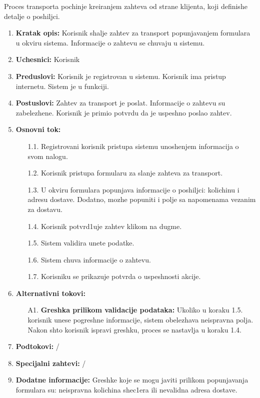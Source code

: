 
Proces transporta pochinje kreiranjem zahteva od strane klijenta, koji definishe detalje o poshiljci. 


\begin{enumerate}
    \item \textbf{Kratak opis:} Korisnik shalje zahtev za transport popunjavanjem formulara u okviru sistema. Informacije o zahtevu se chuvaju u sistemu.
    
    \item \textbf{Uchesnici:} Korisnik
    \item \textbf{Preduslovi:} Korisnik je registrovan u sistemu. Korisnik ima pristup internetu. Sistem je u funkciji.
    \item \textbf{Postuslovi:} Zahtev za transport je poslat. Informacije o zahtevu su zabelezhene. Korisnik je primio potvrdu da je uspeshno poslao zahtev.
    \item \textbf{Osnovni tok:}
        \begin{enumerate}
            \item[1.1.] Registrovani korisnik pristupa sistemu unoshenjem informacija o svom nalogu.
            
            \item[1.2.] Korisnik pristupa formularu za slanje zahteva za transport.
            \item[1.3.] U okviru formulara popunjava informacije o poshiljci: koli\-chinu i adresu dostave. Dodatno, mozhe popuniti i polje sa napomenama vezanim za dostavu.
            \item[1.4.] Korisnik potvrd1uje zahtev klikom na dugme.
            
            \item[1.5.] Sistem validira unete podatke.
            \item[1.6.] Sistem chuva informacije o zahtevu.
            \item[1.7.] Korisniku se prikazuje potvrda o uspeshnosti akcije.
        \end{enumerate}
    \item \textbf{Alternativni tokovi:}
            \begin{enumerate}
                \item [A1.] \textbf{Greshka prilikom validacije podataka: }
                Ukoliko u koraku 1.5. korisnik unese pogreshne informacije, sistem obelezhava neispravna polja. 
                Nakon shto korisnik ispravi greshku, proces se nastavlja u koraku 1.4.
            \end{enumerate}
        
    \item \textbf{Podtokovi:} /
    \item \textbf{Specijalni zahtevi:} /
    \item \textbf{Dodatne informacije:} Greshke koje se mogu javiti prilikom popunjavanja formulara su: neispravna kolichina shec1era ili nevalidna adresa dostave.  
    
\end{enumerate}



